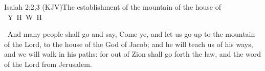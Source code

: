\documentclass[12pt,aspectratio=169]{beamer}
\newcommand{\YA}{%
    \mbox{%
        Y\makebox[0pt][l]{\hspace{-0.178em}\raisebox{-0.00ex}{\scalebox{0.30}{E}}}%
        H\makebox[0pt][l]{\hspace{-0.010em}\raisebox{-0.00ex}{\scalebox{0.30}{O}}}%
        W\makebox[0pt][l]{\hspace{-0.245em}\raisebox{-0.00ex}{\scalebox{0.30}{A}}}%
        H%
    }%
}
\newcommand{\ver}[1]{%
    \raisebox{0.50ex}{%
        \scalebox{1.1}{%
            \pmb{\textbf{\textcolor{BSpbg}{#1}}}%
        }%
    }%
}
\newcommand{\QUOTE}[1]{%
    \par\noindent\hspace*{0.1\linewidth}%
    \begin{minipage}{0.8\linewidth}%
        \linespread{1.50}\large{#1}%
    \end{minipage}%
}
\newcommand{\YEL}[1]{{\textcolor{TXyel}{#1}}}
\newcommand{\GRE}[1]{{\textcolor{TXgre}{#1}}}
\newcommand{\CYA}[1]{{\textcolor{TXcya}{#1}}}
\newcommand{\BLU}[1]{{\textcolor{TXblu}{#1}}}
\newcommand{\MAG}[1]{{\textcolor{TXmag}{#1}}}
\begin{document}
    \begin{frame}{Isaiah 2:2,3 (KJV)}{The establishment of the mountain of the house of \YA}
        \QUOTE{%
            \ver{3}~And \GRE{many people} shall go and say, Come ye, and let us  \CYA{go
            up} to the mountain of the Lord, to the house of the \BLU{God of Jacob}; and
            he will \MAG{teach} us of his ways, and we will \MAG{walk} in his paths: for
            \YEL{out of Zion} shall go forth the \YEL{law,} and the  word  of  the  Lord
            \YEL{from Jerusalem}.
        }
    \end{frame}

\end{document}
